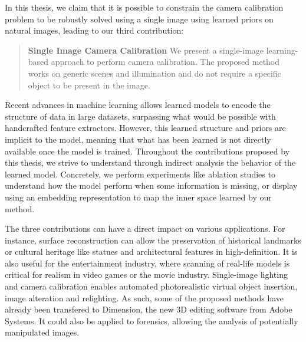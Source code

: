 In this thesis, we claim that it is possible to constrain the camera calibration problem to be robustly solved using a single image using learned priors on natural images, leading to our third contribution: 

\begin{quotation}
\textbf{Single Image Camera Calibration} We present a single-image learning-based approach to perform camera calibration. The proposed method works on generic scenes and illumination and do not require a specific object to be present in the image. 
\end{quotation}

Recent advances in machine learning allows learned models to encode the structure of data in large datasets, surpassing what would be possible with handcrafted feature extractors. However, this learned structure and priors are implicit to the model, meaning that what has been learned is not directly available once the model is trained. Throughout the contributions proposed by this thesis, we strive to understand through indirect analysis the behavior of the learned model. Concretely, we perform experiments like ablation studies to understand how the model perform when some information is missing, or display using an embedding representation to map the inner space learned by our method.


The three contributions can have a direct impact on various applications. For instance, surface reconstruction can allow the preservation of historical landmarks or cultural heritage like statues and architectural features in high-definition. It is also useful for the entertainment industry, where scanning of real-life models is critical for realism in video games or the movie industry. Single-image lighting and camera calibration enables automated photorealistic virtual object insertion, image alteration and relighting. As such, some of the proposed methods have already been transfered to Dimension, the new 3D editing software from Adobe Systems. It could also be applied to forensics, allowing the analysis of potentially manipulated images. 


